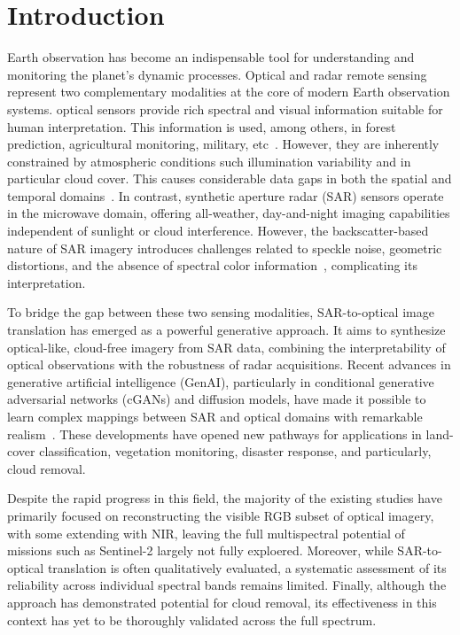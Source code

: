 \chapter{Introduction}

Earth observation has become an indispensable tool for understanding and monitoring the planet’s dynamic processes. Optical and radar remote sensing represent two complementary modalities at the core of modern Earth observation systems. optical sensors provide rich spectral and visual information suitable for human interpretation. This information is used, among others, in forest prediction, agricultural monitoring, military, etc~\cite{S2MS_GAN}. However, they are inherently constrained by atmospheric conditions such illumination variability and in particular cloud cover. This causes considerable data gaps in both the spatial and temporal domains~\cite{CR_SEN2_dRNN}. 
In contrast, synthetic aperture radar (SAR) sensors operate in the microwave domain, offering all-weather, day-and-night imaging capabilities independent of sunlight or cloud interference. However, the backscatter-based nature of SAR imagery introduces challenges related to speckle noise, geometric distortions, and the absence of spectral color information~\cite{bench_sar_color, naderi2021}, complicating its interpretation.

To bridge the gap between these two sensing modalities, SAR-to-optical image translation has emerged as a powerful generative approach. It aims to synthesize optical-like, cloud-free imagery from SAR data, combining the interpretability of optical observations with the robustness of radar acquisitions. Recent advances in generative artificial intelligence (GenAI), particularly in conditional generative adversarial networks (cGANs) and diffusion models, have made it possible to learn complex mappings between SAR and optical domains with remarkable realism~\cite{cr_fuse_HR_GEN}. 
These developments have opened new pathways for applications in land-cover classification, vegetation monitoring, disaster response, and particularly, cloud removal. %

Despite the rapid progress in this field, the majority of the existing studies have primarily focused on reconstructing the visible RGB subset of optical imagery, with some extending with NIR, leaving the full multispectral potential of missions such as Sentinel-2 largely not fully exploered. Moreover, while SAR-to-optical translation is often qualitatively evaluated, a systematic assessment of its reliability across individual spectral bands remains limited. Finally, although the approach has demonstrated potential for cloud removal, its effectiveness in this context has yet to be thoroughly validated across the full spectrum.

